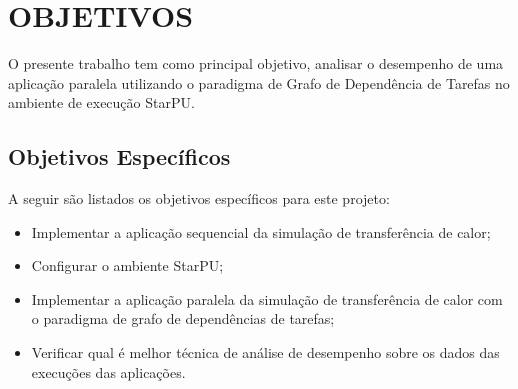 
\chapter{OBJETIVOS}
\label{chap:objetivos}

O presente trabalho tem como principal objetivo, analisar o desempenho de uma aplicação paralela utilizando o paradigma de
Grafo de Dependência de Tarefas no ambiente de execução StarPU.

\section{Objetivos Específicos}

A seguir são listados os objetivos específicos para este projeto:\\

\begin{itemize}
    \item Implementar a aplicação sequencial da simulação de transferência de calor;
    \item Configurar o ambiente StarPU;
    \item Implementar a aplicação paralela da simulação de transferência de calor com o paradigma de grafo de dependências de tarefas;
    \item Verificar qual é melhor técnica de análise de desempenho sobre os dados das execuções das aplicações.
\end{itemize}
